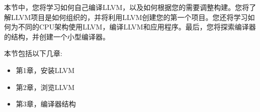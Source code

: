 
本节中，您将学习如何自己编译LLVM，以及如何根据您的需要调整构建。您将了解LLVM项目是如何组织的，并将利用LLVM创建您的第一个项目。您还将学习如何为不同的CPU架构使用LLVM，编译LLVM和应用程序。最后，您将探索编译器的结构，并创建一个小型编译器。\par

本节包括以下几章:\par

\begin{itemize}
	\item 第1章，安装LLVM
	\item 第2章，浏览LLVM
	\item 第3章，编译器结构
\end{itemize}

\newpage

